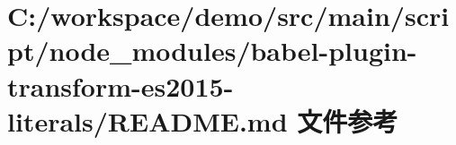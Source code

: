 \hypertarget{node__modules_2babel-plugin-transform-es2015-literals_2_r_e_a_d_m_e_8md}{}\section{C\+:/workspace/demo/src/main/script/node\+\_\+modules/babel-\/plugin-\/transform-\/es2015-\/literals/\+R\+E\+A\+D\+ME.md 文件参考}
\label{node__modules_2babel-plugin-transform-es2015-literals_2_r_e_a_d_m_e_8md}

